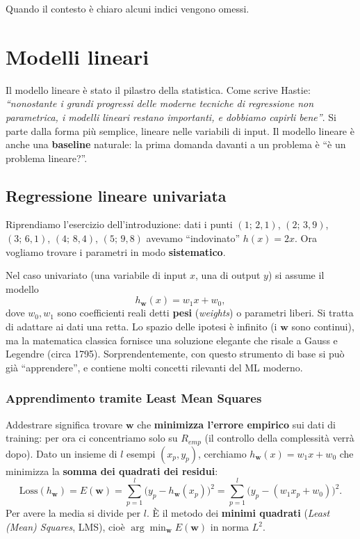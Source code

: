 Quando il contesto è chiaro alcuni indici vengono omessi.

\section{Modelli lineari}\label{modelli-lineari}

Il modello lineare è stato il pilastro della statistica. Come scrive
Hastie: \emph{``nonostante i grandi progressi delle moderne tecniche di
regressione non parametrica, i modelli lineari restano importanti, e
dobbiamo capirli bene''}. Si parte dalla forma più semplice, lineare
nelle variabili di input. Il modello lineare è anche una
\textbf{baseline} naturale: la prima domanda davanti a un problema è ``è
un problema lineare?''.

\subsection{Regressione lineare
univariata}\label{regressione-lineare-univariata}

Riprendiamo l'esercizio dell'introduzione: dati i punti \((1;\,2{,}1)\),
\((2;\,3{,}9)\), \((3;\,6{,}1)\), \((4;\,8{,}4)\), \((5;\,9{,}8)\)
avevamo ``indovinato'' \(h(x) = 2x\). Ora vogliamo trovare i parametri
in modo \textbf{sistematico}.

Nel caso univariato (una variabile di input \(x\), una di output \(y\))
si assume il modello \[
h_\mathbf{w}(x) = w_1 x + w_0,
\] dove \(w_0, w_1\) sono coefficienti reali detti \textbf{pesi}
(\emph{weights}) o parametri liberi. Si tratta di adattare ai dati una
retta. Lo spazio delle ipotesi è infinito (i \(\mathbf{w}\) sono
continui), ma la matematica classica fornisce una soluzione elegante che
risale a Gauss e Legendre (circa 1795). Sorprendentemente, con questo
strumento di base si può già ``apprendere'', e contiene molti concetti
rilevanti del ML moderno.

\subsubsection{Apprendimento tramite Least Mean
Squares}\label{apprendimento-tramite-least-mean-squares}

Addestrare significa trovare \(\mathbf{w}\) che \textbf{minimizza
l'errore empirico} sui dati di training: per ora ci concentriamo solo su
\(R_{emp}\) (il controllo della complessità verrà dopo). Dato un insieme
di \(l\) esempi \((x_p, y_p)\), cerchiamo
\(h_\mathbf{w}(x) = w_1 x + w_0\) che minimizza la \textbf{somma dei
quadrati dei residui}: \[
\text{Loss}(h_\mathbf{w}) = E(\mathbf{w}) = \sum_{p=1}^{l} \big(y_p - h_\mathbf{w}(x_p)\big)^2 = \sum_{p=1}^{l} \big(y_p - (w_1 x_p + w_0)\big)^2.
\] Per avere la media si divide per \(l\). È il metodo dei
\textbf{minimi quadrati} (\emph{Least (Mean) Squares}, LMS), cioè
\(\arg\min_\mathbf{w} E(\mathbf{w})\) in norma \(L^2\).

